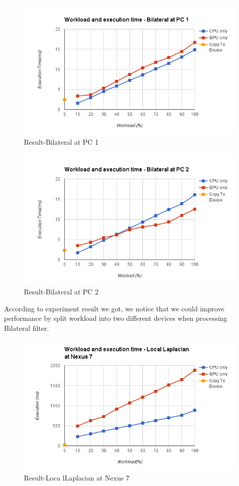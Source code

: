 \begin{figure}[hbtp]
\centering
\includegraphics[width=12cm]{img/Result-WorkloadbetweenCPUandGPU(Bilateral@PC1).png}
\caption{Result-Bilateral at PC 1 }
\label{fig:my_label}
\end{figure}

\begin{figure}[hbtp]
\centering
\includegraphics[width=12cm]{img/Result-WorkloadbetweenCPUandGPU(Bilateral@PC2).png}
\caption{Result-Bilateral at PC 2 }
\label{fig:my_label}
\end{figure}

According to experiment result we got, we notice that we could improve performance by split workload into two different devices when processing Bilateral filter. 

\begin{figure}[hbtp]
\centering
\includegraphics[width=12cm]{img/Result-WorkloadbetweenCPUandGPU(LocalLaplacian@Nexus7).png}
\caption{Result-Loca lLaplacian at Nexus 7 }
\label{fig:my_label}
\end{figure}

